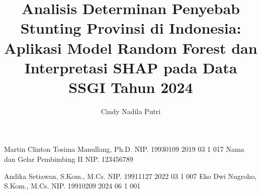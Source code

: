 \documentclass[12pt, a4paper, onecolumn, oneside, final]{report}
\begin{document}

    
    \title{Analisis Determinan Penyebab Stunting Provinsi di Indonesia: Aplikasi Model Random Forest dan 
Interpretasi SHAP pada Data SSGI Tahun 2024 } %
    
    \author{Cindy Nadila Putri}		%
	
	\dosbingA%
		{Martin Clinton Tosima Manullang, Ph.D.}%
		{NIP. 19930109 2019 03 1 017}				%
	\dosbingB%
		{Nama dan Gelar Pembimbing II}%
		{NIP. 123456789}				%
		
	\pengujiA%
		{Andika Setiawan, S.Kom., M.Cs.}%
		{NIP. 19911127 2022 03 1 007}				%
	\pengujiB%
		{Eko Dwi Nugroho, S.Kom., M.Cs.}%
		{NIP. 19910209 2024 06 1 001}				%

	\sloppy %
    \setcounter{page}{1} %







    
%    
%   

    \tableofcontents
    \pagebreak
    \listoftables
    \pagebreak
    \listoffigures
    \pagebreak
    \listofmyequations
%    
    \lstlistoflistings
    \pagebreak
    
\end{document}
